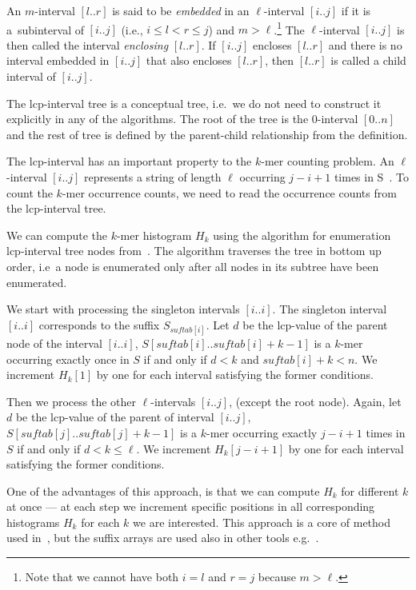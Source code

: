 \begin{definition}
  An $m$-interval $[l..r]$ is said to be \emph{embedded} in an $\ell$-interval $[i..j]$ if it is a~subinterval of $[i..j]$ (i.e., $i \leq l < r \leq j $) and $m > \ell$.\footnote{Note that we cannot have both $i = l$ and $r = j$ because $m > \ell$.}
  The $\ell$-interval $[i..j ]$ is then called the interval \emph{enclosing} $[l..r]$. If $[i..j]$ encloses $[l..r]$ and there is no interval embedded in $[i..j]$ that also encloses $[l..r]$, then $[l..r]$ is called a child interval of $[i..j]$.
\end{definition}

The lcp-interval tree is a conceptual tree, i.e.\ we do not need to construct it explicitly in any of the algorithms. The root of the tree is the $0$-interval $[0..n]$ and the rest of tree is defined by the parent-child relationship from the definition.


The lcp-interval has an important property to the $k$-mer counting problem. An $\ell$-interval $[i..j]$ represents a string of length $\ell$ occurring $j - i + 1$ times in S~\cite{tallymer}. To count the $k$-mer occurrence counts, we need to read the occurrence counts from the lcp-interval tree.

We can compute the $k$-mer histogram $H_k$ using the algorithm for enumeration lcp-interval tree nodes from~\cite{enhancedsuffixarrays}. The algorithm traverses the tree in bottom up order, i.e\ a node is enumerated only after all nodes in its subtree have been enumerated.

We start with processing the singleton intervals $[i..i]$. The singleton interval $[i..i]$ corresponds to the suffix $S_{suftab[i]}$. Let $d$ be the lcp-value of the parent node of the interval $[i..i]$, $S[suftab[i]..suftab[i]+k-1]$ is a $k$-mer occurring exactly once in $S$ if and only if $d < k$ and $suftab[i]+k < n$. We increment $H_k[1]$ by one for each interval satisfying the former conditions.

Then we process the other $\ell$-intervals $[i..j]$, (except the root node). Again, let $d$ be the lcp-value of the parent of interval $[i..j]$, $S[suftab[j]..suftab[j] + k - 1]$ is a $k$-mer occurring exactly $j - i + 1$ times in $S$ if and only if $d < k \leq \ell$. We increment $H_k[j-i+1]$ by one for each interval satisfying the former conditions.

One of the advantages of this approach, is that we can compute $H_k$ for different $k$ at once --- at each step we increment specific positions in all corresponding histograms $H_k$ for each $k$ we are interested. This approach is a core of method used in~\cite{tallymer}, but the suffix arrays are used also in other tools e.g.~\cite{jellyfish}.


